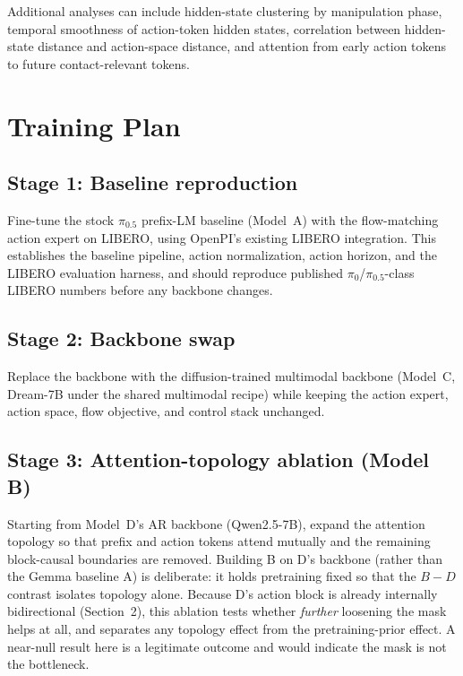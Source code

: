 \documentclass[11pt]{article}
\begin{document}
Additional analyses can include hidden-state clustering by manipulation phase, temporal smoothness of action-token hidden states, correlation between hidden-state distance and action-space distance, and attention from early action tokens to future contact-relevant tokens.

\section{Training Plan}

\subsection{Stage 1: Baseline reproduction}

Fine-tune the stock $\pi_{0.5}$ prefix-LM baseline (Model~A) with the flow-matching action expert on LIBERO, using OpenPI's existing LIBERO integration. This establishes the baseline pipeline, action normalization, action horizon, and the LIBERO evaluation harness, and should reproduce published $\pi_{0}$/$\pi_{0.5}$-class LIBERO numbers before any backbone changes.

\subsection{Stage 2: Backbone swap}

Replace the backbone with the diffusion-trained multimodal backbone (Model~C, Dream-7B under the shared multimodal recipe) while keeping the action expert, action space, flow objective, and control stack unchanged.

\subsection{Stage 3: Attention-topology ablation (Model B)}

Starting from Model~D's AR backbone (Qwen2.5-7B), expand the attention topology so that prefix and action tokens attend mutually and the remaining block-causal boundaries are removed. Building B on D's backbone (rather than the Gemma baseline A) is deliberate: it holds pretraining fixed so that the $B - D$ contrast isolates topology alone. Because D's action block is already internally bidirectional (Section~2), this ablation tests whether \emph{further} loosening the mask helps at all, and separates any topology effect from the pretraining-prior effect. A near-null result here is a legitimate outcome and would indicate the mask is not the bottleneck.
\end{document}
